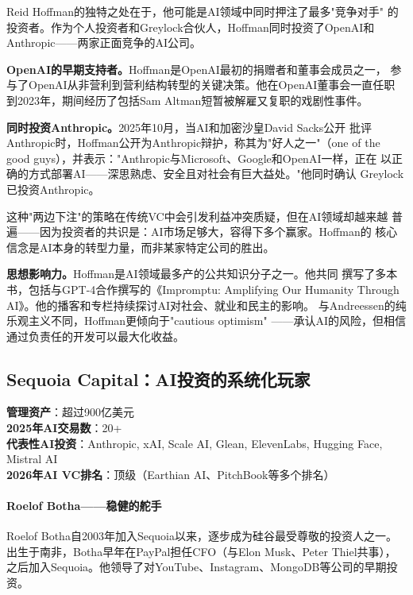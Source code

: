 Reid Hoffman的独特之处在于，他可能是AI领域中同时押注了最多"竞争对手"
的投资者。作为个人投资者和Greylock合伙人，Hoffman同时投资了OpenAI和
Anthropic——两家正面竞争的AI公司。

\textbf{OpenAI的早期支持者。}Hoffman是OpenAI最初的捐赠者和董事会成员之一，
参与了OpenAI从非营利到营利结构转型的关键决策。他在OpenAI董事会一直任职
到2023年，期间经历了包括Sam Altman短暂被解雇又复职的戏剧性事件。

\textbf{同时投资Anthropic。}2025年10月，当AI和加密沙皇David Sacks公开
批评Anthropic时，Hoffman公开为Anthropic辩护，称其为"好人之一"（one of
the good guys），并表示："Anthropic与Microsoft、Google和OpenAI一样，正在
以正确的方式部署AI——深思熟虑、安全且对社会有巨大益处。"他同时确认
Greylock已投资Anthropic。

这种"两边下注"的策略在传统VC中会引发利益冲突质疑，但在AI领域却越来越
普遍——因为投资者的共识是：AI市场足够大，容得下多个赢家。Hoffman的
核心信念是AI本身的转型力量，而非某家特定公司的胜出。

\textbf{思想影响力。}Hoffman是AI领域最多产的公共知识分子之一。他共同
撰写了多本书，包括与GPT-4合作撰写的《Impromptu: Amplifying Our Humanity
Through AI》。他的播客和专栏持续探讨AI对社会、就业和民主的影响。
与Andreessen的纯乐观主义不同，Hoffman更倾向于"cautious optimism"
——承认AI的风险，但相信通过负责任的开发可以最大化收益。


\subsection{Sequoia Capital：AI投资的系统化玩家}
\label{subsec:inv-sequoia}

\begin{corebox}
\textbf{管理资产}：超过900亿美元 \\
\textbf{2025年AI交易数}：20+ \\
\textbf{代表性AI投资}：Anthropic, xAI, Scale AI, Glean, ElevenLabs,
  Hugging Face, Mistral AI \\
\textbf{2026年AI VC排名}：顶级（Earthian AI、PitchBook等多个排名）
\end{corebox}

\paragraph{Roelof Botha——稳健的舵手}

Roelof Botha自2003年加入Sequoia以来，逐步成为硅谷最受尊敬的投资人之一。
出生于南非，Botha早年在PayPal担任CFO（与Elon Musk、Peter Thiel共事），
之后加入Sequoia。他领导了对YouTube、Instagram、MongoDB等公司的早期投资。

